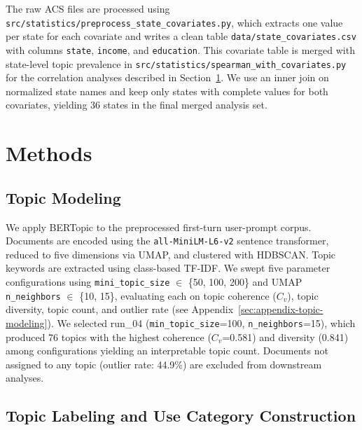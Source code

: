 \documentclass[11pt]{article}
\begin{document}
The raw ACS files are processed using \texttt{src/statistics/preprocess\_state\_covariates.py}, which extracts one value per state for each covariate and writes a clean table \texttt{data/state\_covariates.csv} with columns \texttt{state}, \texttt{income}, and \texttt{education}. This covariate table is merged with state-level topic prevalence in \texttt{src/statistics/spearman\_with\_covariates.py} for the correlation analyses described in Section~\ref{sec:methods}. We use an inner join on normalized state names and keep only states with complete values for both covariates, yielding 36 states in the final merged analysis set.


\section{Methods}
\label{sec:methods}

\subsection{Topic Modeling}

We apply BERTopic \citep{grootendorst2022bertopic} to the preprocessed first-turn user-prompt corpus. Documents are encoded using the \texttt{all-MiniLM-L6-v2} sentence transformer, reduced to five dimensions via UMAP, and clustered with HDBSCAN. Topic keywords are extracted using class-based TF-IDF. We swept five parameter configurations using \texttt{mini\_topic\_size} $\in$ \{50, 100, 200\} and UMAP \texttt{n\_neighbors}  $\in$ \{10, 15\}, evaluating each on topic coherence ($C_v$), topic diversity, topic count, and outlier rate (see Appendix~\ref{sec:appendix-topic-modeling}). We selected run\_04 (\texttt{min\_topic\_size}=100, \texttt{n\_neighbors}=15), which produced 76 topics with the highest coherence ($C_v$=0.581) and diversity (0.841) among configurations yielding an interpretable topic count. Documents not assigned to any topic (outlier rate: 44.9\%) are excluded from downstream analyses.

\subsection{Topic Labeling and Use Category Construction}
\end{document}
